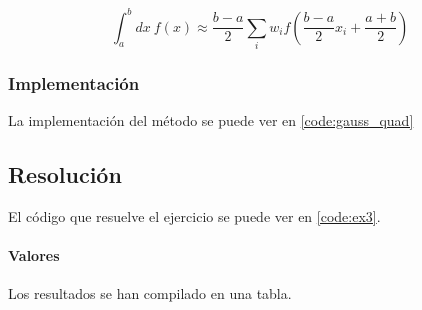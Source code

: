 \begin{equation}
\int_{a}^{b}dx~ f(x) \approx
\frac{b - a}{2}
\sum_{i}w_i f(\frac{b-a}{2} x_i + \frac{a + b}{2} )
\end{equation}



\subsubsection{Implementación}

La implementación del método se puede ver en \ref{code:gauss_quad}


\subsection{Resolución}


El código que resuelve el ejercicio se puede ver en \ref{code:ex3}. 

\paragraph{Valores} Los resultados se han compilado en una tabla.


\begin{table}[H]
	\centering
\end{table}



